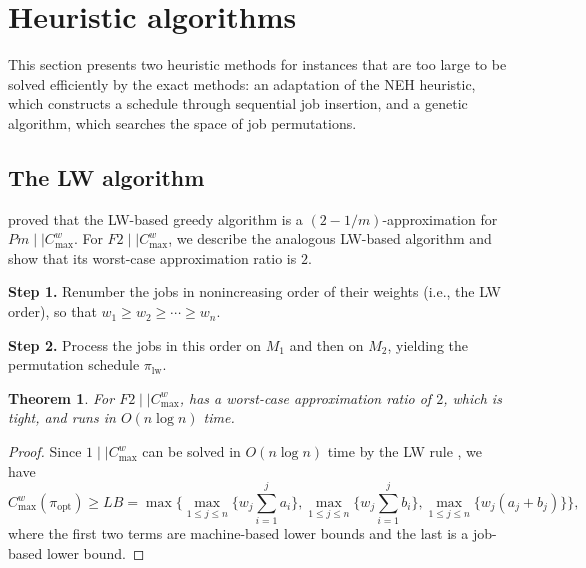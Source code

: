 ﻿\documentclass[12pt]{article} \textheight=24.5cm \textwidth=16.5cm \parskip = 0.165cm
\newtheorem{theorem}{Theorem}[section]
\let\origsection\section
\renewcommand{\section}{\FloatBarrier\origsection}
\begin{document}
\begin{sloppypar}
        \section{Heuristic algorithms} \label{sec:heuristics}
        
        This section presents two heuristic methods for instances that are too large to be solved efficiently 
        by the exact methods: an adaptation of the NEH heuristic, which constructs a schedule through sequential job insertion, 
        and a genetic algorithm, which searches the space of job permutations.
        
        
        \subsection{The LW algorithm} \label{sec:lw}
        
        \cite{Sun2024JOCO} proved that the LW-based greedy algorithm is a $(2-1/m)$-approximation for $Pm \mid \mid C_{\max}^w$. For $F2 \mid \mid C_{\max}^w$, we describe the analogous LW-based algorithm and show that its worst-case approximation ratio is $2$.
        
        \begin{algorithm}[H]
            \small
            \linespread{1.2}\selectfont
            \SetAlgoLined
            \DontPrintSemicolon
            \caption{LW's rule for $F2 \mid \mid C_{\max}^w$} \label{Alg-LW}
            \BlankLine
            \textbf{Step 1.} Renumber the jobs in nonincreasing order of their weights (i.e., the LW order), so that $w_1 \geq w_2 \geq \cdots \geq w_n$. \;
            
            \textbf{Step 2.} Process the jobs in this order on $M_1$ and then on $M_2$, yielding the permutation schedule $\pi_{\mathrm{lw}}$. \;
            
        \end{algorithm}
        
        \begin{theorem}\label{Thm-LW}
            For $F2 \mid \mid C_{\max}^w$,  has a worst-case approximation ratio of $2$, which is tight, and runs in $O(n\log n)$ time.
        \end{theorem}
        
        \begin{proof}
            Since $1 \mid \mid C_{\max}^w$ can be solved in $O(n\log n)$ time by the LW rule \citep{NongChengNg2011EJOR}, we have
            \begin{equation}\label{Eq-LB}
                C_{\max}^w(\pi_{\mathrm{opt}}) \geq LB=\max \Big \{\max_{1 \leq j \leq n} \Big\{w_j \sum_{i=1}^j a_i \Big\}, \max_{1 \leq j \leq n} \Big\{w_j \sum_{i=1}^j b_i\Big\}, \max_{1 \leq j \leq n} \Big\{w_j (a_j+b_j)\Big\} \Big\},
            \end{equation}
            where the first two terms are machine-based lower bounds and the last is a job-based lower bound.   
            

\end{proof}
\end{sloppypar}
\end{document}
